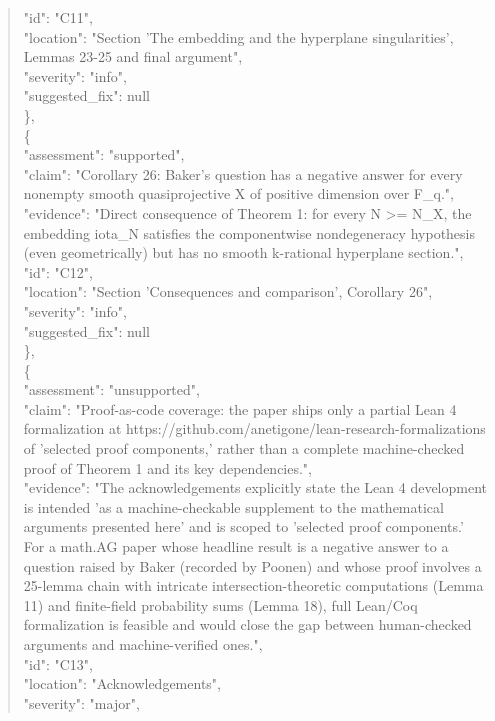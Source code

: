 \documentclass[11pt]{article}
\begin{document}
\begin{quote}
      "id": "C11",\\
      "location": "Section 'The embedding and the hyperplane singularities', Lemmas 23-25 and final argument",\\
      "severity": "info",\\
      "suggested\_fix": null\\
    \},\\
    \{\\
      "assessment": "supported",\\
      "claim": "Corollary 26: Baker's question has a negative answer for every nonempty smooth quasiprojective X of positive dimension over F\_q.",\\
      "evidence": "Direct consequence of Theorem 1: for every N >= N\_X, the embedding iota\_N satisfies the componentwise nondegeneracy hypothesis (even geometrically) but has no smooth k-rational hyperplane section.",\\
      "id": "C12",\\
      "location": "Section 'Consequences and comparison', Corollary 26",\\
      "severity": "info",\\
      "suggested\_fix": null\\
    \},\\
    \{\\
      "assessment": "unsupported",\\
      "claim": "Proof-as-code coverage: the paper ships only a partial Lean 4 formalization at https://github.com/anetigone/lean-research-formalizations of 'selected proof components,' rather than a complete machine-checked proof of Theorem 1 and its key dependencies.",\\
      "evidence": "The acknowledgements explicitly state the Lean 4 development is intended 'as a machine-checkable supplement to the mathematical arguments presented here' and is scoped to 'selected proof components.' For a math.AG paper whose headline result is a negative answer to a question raised by Baker (recorded by Poonen) and whose proof involves a 25-lemma chain with intricate intersection-theoretic computations (Lemma 11) and finite-field probability sums (Lemma 18), full Lean/Coq formalization is feasible and would close the gap between human-checked arguments and machine-verified ones.",\\
      "id": "C13",\\
      "location": "Acknowledgements",\\
      "severity": "major",\\

\end{quote}
\end{document}
